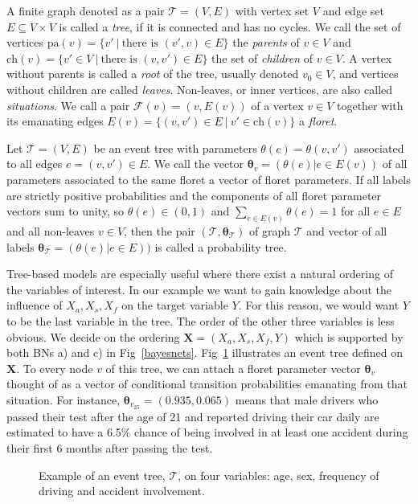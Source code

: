 \documentclass[runningheads]{llncs}
\begin{document}
A finite graph denoted as a pair $\mathcal{T} = (V,E)$ with vertex set $V$ and edge set $E \subseteq V \times V$ is called a \emph{tree}, if it is connected and has no cycles. We call the set of vertices $\text{pa}(v) = \{v' \ | \ \text{there is } (v',v) \in E\}$ the \emph{parents} of $v \in V$ and $\text{ch}(v)=\{v' \in V \ | \ \text{there is } (v,v') \in E\}$ the set of \emph{children} of $v \in V$. A vertex without parents is called a \emph{root} of the tree, usually denoted $v_0 \in V$, and vertices without children are called \emph{leaves}. Non-leaves, or inner vertices, are also called \emph{situations}. We call a pair $\mathcal{F}(v) = (v,E(v))$ of a vertex $v \in V$ together with its emanating edges $E(v) = \{(v,v') \in E \ | \ v' \in \text{ch}(v)\}$ a \emph{floret}.
\begin{definition}
Let $\mathcal{T} = (V, E)$ be an event tree with parameters $\theta(e) = \theta(v, v')$ associated to all edges $e = (v, v') \in E$. We call the vector $\boldsymbol{\theta}_v = (\theta(e)| e \in E(v))$ of all parameters associated to the same floret a vector of floret parameters. If all labels are strictly positive probabilities and the components of all floret parameter vectors sum to unity, so  $\theta(e) \in (0,1)$ and $\sum_{e \in E(v)}\theta(e) = 1$ for all $e \in E$ and all non-leaves $v \in V$, then the pair
$(\mathcal{T}, \boldsymbol{\theta}_{\mathcal{T}})$ of graph $\mathcal{T}$ and vector of all labels $\boldsymbol{\theta}_{\mathcal{T}} = (\theta(e)| e \in E))$ is called a probability tree.
\end{definition}
Tree-based models are especially useful where there exist a natural ordering of the variables of interest. In our example we want to gain knowledge about the influence of $X_a, X_s, X_f$ on the target variable $Y$. For this reason, we would want $Y$ to be the last variable in the tree. The order of the other three variables is less obvious. We decide on the ordering $\boldsymbol{X} = (X_a, X_s, X_f, Y)$ which is supported by both BNs a) and c) in Fig~\ref{bayesnets}. 
Fig~\ref{eventtree} illustrates an event tree defined on $\boldsymbol{X}$. To every node $v$ of this tree, we can attach a floret parameter vector $\boldsymbol{\theta}_v$ thought of as a vector of conditional transition probabilities emanating from that situation. For instance, $\boldsymbol{\theta}_{v_{25}} = (0.935, 0.065)$ means that male drivers who passed their test after the age of 21 and reported driving their car daily are estimated to have a 6.5\% chance of being involved in at least one accident during their first 6 months after passing the test. 
\begin{figure}
\centering

\caption{Example of an event tree, $\mathcal{T}$, on four variables: age, sex, frequency of driving and accident involvement.}
\label{eventtree}
\end{figure}
\end{document}
